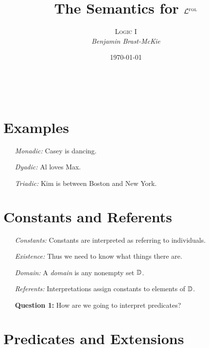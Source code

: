 \documentclass[a4paper, 11pt]{article} %
\title{\textbf{The Semantics for $\mathcal{L}^{\textsc{fol}}$}} %
\author{\textsc{Logic I}\\ \em Benjamin Brast-McKie} %
\date{\today} %
\makeatletter
\renewcommand{\maketitle}{
\begin{flushright}
{\LARGE\@title}

\vspace{10pt}

{\@author}
\\ \@date
\end{flushright}

\vspace{-20pt}

}
\makeatother
\begin{document}
\maketitle %

\thispagestyle{empty}


\section*{Examples}%
  \label{sec:Examples}
  
\begin{enumerate}
  \item[\it Monadic:] Casey is dancing.
  \item[\it Dyadic:] Al loves Max.
  \item[\it Triadic:] Kim is between Boston and New York.
\end{enumerate}

\section*{Constants and Referents}%
  \label{sec:Extensions and Referents}
  
\begin{enumerate}
  \item[\it Constants:] Constants are interpreted as referring to individuals.
  \item[\it Existence:] Thus we need to know what things there are.
  \item[\it Domain:] A \textit{domain} is any nonempty set $\mathbb{D}$.
  \item[\it Referents:] Interpretations assign constants to elements of $\mathbb{D}$.
  \item[\bf Question 1:] How are we going to interpret predicates?
\end{enumerate}



\section*{Predicates and Extensions}%
  \label{sec:Extensions}
  
\end{document}
